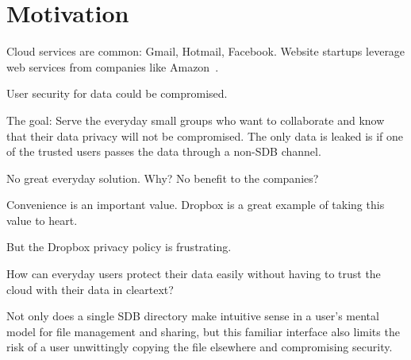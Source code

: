 \section{Motivation}

Cloud services are common: Gmail, Hotmail, Facebook. Website startups leverage
web services from companies like Amazon~\cite{aws}.

User security for data could be compromised.

The goal: Serve the everyday small groups who want to collaborate and
know that their data privacy will not be compromised. The only data is
leaked is if one of the trusted users passes the data through a
non-SDB channel.

No great everyday solution. Why? No benefit to the companies?

Convenience is an important value. Dropbox is a great example of
taking this value to heart. 

But the Dropbox privacy policy is frustrating.

How can everyday users protect their data easily without having to
trust the cloud with their data in cleartext?

Not only does a single SDB directory make intuitive sense in a user's
mental model for file management and sharing, but this familiar
interface also limits the risk of a user unwittingly copying the file
elsewhere and compromising security.


